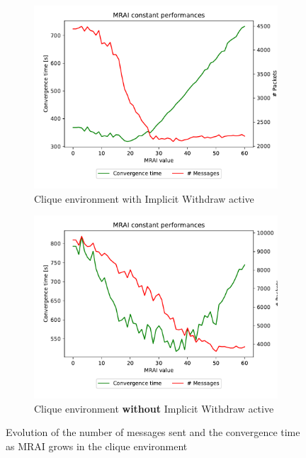 \documentclass[10pt,conference,letterpaper]{IEEEtran}
\newcommand{\figwidth}{0.78}
\newcommand{\figvspace}{-1.5em}
\begin{document}
\begin{figure}[tb]
	\centering

	\begin{subfigure}{\columnwidth}
		\centering
		\includegraphics[width=\figwidth\columnwidth]{images/clique/mrai_evolution}
		\caption{Clique environment with Implicit Withdraw active}
		\label{fig:clique_IW_mrai_evolution}
		\qquad
	\end{subfigure}

	\begin{subfigure}{\columnwidth}
		\centering
		\includegraphics[width=\figwidth\columnwidth]{images/clique-noImplicitWithdraw/mrai_evolution}
		\caption{Clique environment \textbf{without} Implicit Withdraw active}
		\label{fig:clique_noIW_mrai_evolution}
		\qquad
	\end{subfigure}

	\caption{Evolution of the number of messages sent and the convergence time as \ac{MRAI} grows
		in the clique environment}
	\label{fig:clique_mrai_evolution}
	\vspace{\figvspace}
\end{figure}
\end{document}
